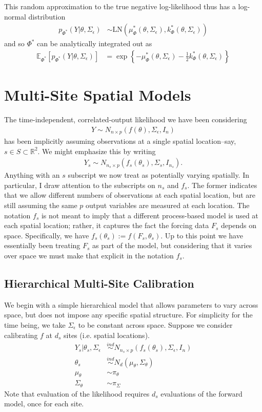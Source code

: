 \documentclass[12pt]{article}
\newcommand{\E}{\mathbb{E}}
\newcommand{\R}{\mathbb{R}}
\begin{document}
This random approximation to the true negative log-likelihood thus has a log-normal distribution 
\begin{align}
p_{\Phi^*}(Y|\theta, \Sigma_\epsilon) &\sim \text{LN}\left(\mu^*_\Phi(\theta, \Sigma_\epsilon), k^*_\Phi(\theta, \Sigma_\epsilon) \right)
\end{align}
and so $\Phi^*$ can be analytically integrated out as
\begin{align}
\E_{\Phi^*}\left[p_{\Phi^*}(Y|\theta, \Sigma_\epsilon) \right] &= \exp\left\{-\mu^*_\Phi(\theta, \Sigma_\epsilon) - \frac{1}{2}k^*_\Phi(\theta, \Sigma_\epsilon) \right\}
\end{align}

\section{Multi-Site Spatial Models}
The time-independent, correlated-output likelihood we have been considering
\begin{align}
Y \sim N_{n \times p}(f(\theta), \Sigma_\epsilon, I_n)
\end{align}
has been implicitly assuming observations at a single spatial location--say, $s \in S \subset \R^2$. We might emphasize this by writing
\begin{align}
Y_s \sim N_{n_s \times p}(f_s(\theta_s), \Sigma_s, I_{n_s}).
\end{align}
Anything with an $s$ subscript we now treat as potentially varying spatially. In particular, I draw attention to the subscripts on $n_s$ and $f_s$. The former 
indicates that we allow different numbers of observations at each spatial location, but are still assuming the same $p$ output variables are measured at each location. 
The notation $f_s$ is not meant to imply that a different process-based model is used at each spatial location; rather, it captures the fact the forcing data $F_s$ depends 
on space. Specifically, we have $f_s(\theta_s) := f(F_s, \theta_s)$. Up to this point we have essentially been treating $F_s$ as part of the model, but considering that it varies 
over space we must make that explicit in the notation $f_s$. 

\subsection{Hierarchical Multi-Site Calibration}
We begin with a simple hierarchical model that allows parameters to vary across space, but does not impose any specific spatial structure. For simplicity for the time being, 
we take $\Sigma_\epsilon$ to be constant across space. Suppose we consider calibrating $f$ at $d_s$ sites (i.e. spatial locations). 
\begin{align}
Y_s|\theta_s, \Sigma_\epsilon &\overset{ind}{\sim} N_{n_{s} \times p}(f_s(\theta_s), \Sigma_\epsilon, I_n) \\ 
\theta_s &\overset{ind}{\sim} N_{d}(\mu_\theta, \Sigma_\theta) \nonumber \\
\mu_\theta &\sim \pi_\theta \nonumber \\
\Sigma_\theta &\sim \pi_\Sigma \nonumber
\end{align}
Note that evaluation of the likelihood requires $d_s$ evaluations of the forward model, once for each site. 
\end{document}
